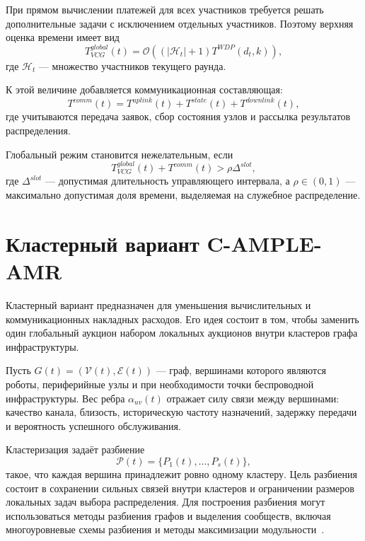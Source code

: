 При прямом вычислении платежей для всех участников требуется решать дополнительные задачи с исключением отдельных участников. Поэтому верхняя оценка времени имеет вид
\begin{equation}
    T^{global}_{VCG}(t)=\mathcal{O}\left((|\mathcal{H}_t|+1)T^{WDP}(d_t,k)\right),
    \label{eq:ch5_global_vcg_time}
\end{equation}
где $\mathcal{H}_t$ --- множество участников текущего раунда.

К этой величине добавляется коммуникационная составляющая:
\begin{equation}
    T^{comm}(t)=T^{uplink}(t)+T^{state}(t)+T^{downlink}(t),
    \label{eq:ch5_comm_time}
\end{equation}
где учитываются передача заявок, сбор состояния узлов и рассылка результатов распределения.

Глобальный режим становится нежелательным, если
\begin{equation}
    T^{global}_{VCG}(t)+T^{comm}(t)>\rho\Delta^{slot},
    \label{eq:ch5_global_limit}
\end{equation}
где $\Delta^{slot}$ --- допустимая длительность управляющего интервала, а $\rho\in(0,1)$ --- максимально допустимая доля времени, выделяемая на служебное распределение.

\section{Кластерный вариант C-AMPLE-AMR}

Кластерный вариант предназначен для уменьшения вычислительных и коммуникационных накладных расходов. Его идея состоит в том, чтобы заменить один глобальный аукцион набором локальных аукционов внутри кластеров графа инфраструктуры.

Пусть $G(t)=(\mathcal{V}(t),\mathcal{E}(t))$ --- граф, вершинами которого являются роботы, периферийные узлы и при необходимости точки беспроводной инфраструктуры. Вес ребра $\alpha_{uv}(t)$ отражает силу связи между вершинами: качество канала, близость, историческую частоту назначений, задержку передачи и вероятность успешного обслуживания.

Кластеризация задаёт разбиение
\begin{equation}
    \mathcal{P}(t)=\{P_1(t),\ldots,P_s(t)\},
    \label{eq:ch5_partition}
\end{equation}
такое, что каждая вершина принадлежит ровно одному кластеру. Цель разбиения состоит в сохранении сильных связей внутри кластеров и ограничении размеров локальных задач выбора распределения. Для построения разбиения могут использоваться методы разбиения графов и выделения сообществ, включая многоуровневые схемы разбиения и методы максимизации модульности~\cite{Karypis1998Metis,Blondel2008Louvain}.

